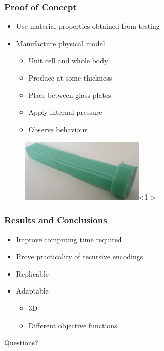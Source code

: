 \documentclass[serif, pdf]{beamer}
\begin{document}
\begin{frame}
    \frametitle{Proof of Concept}
    \begin{itemize}
        \item<1-> Use material properties obtained from testing
        \item<2-> Manufacture physical model
        \changefontsizes{11pt}
        \begin{itemize}
            \item<3-> Unit cell and whole body
            \item<4-> Produce at some thickness
            \item<5-> Place between glass plates
            \item<6-> Apply internal pressure
            \item<7-> Observe behaviour
        \end{itemize}
    \end{itemize}
    \begin{figure}
        \centering
        \includegraphics[height = 3cm]{Mold_Star_15.jpg}<1->
    \end{figure}
\end{frame}


\begin{frame}
    \frametitle{Results and Conclusions}
    \begin{itemize}
        \item<1-> Improve computing time required
        \item<2-> Prove practicality of recursive encodings
        \item<3-> Replicable
        \item<4-> Adaptable
        \begin{itemize}
            \item<5-> 3D
            \item<6-> Different objective functions
        \end{itemize}
    \end{itemize}
\end{frame}


\begin{frame}
    \begin{center}
        \huge Questions?
    \end{center}
\end{frame}
\end{document}

